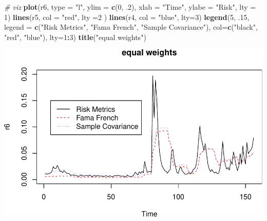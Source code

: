 \documentclass[11pt,]{article}
\newenvironment{Shaded}{\begin{snugshade}}{\end{snugshade}}
\newcommand{\CommentTok}[1]{\textcolor[rgb]{0.56,0.35,0.01}{\textit{#1}}}
\newcommand{\DataTypeTok}[1]{\textcolor[rgb]{0.13,0.29,0.53}{#1}}
\newcommand{\DecValTok}[1]{\textcolor[rgb]{0.00,0.00,0.81}{#1}}
\newcommand{\FloatTok}[1]{\textcolor[rgb]{0.00,0.00,0.81}{#1}}
\newcommand{\KeywordTok}[1]{\textcolor[rgb]{0.13,0.29,0.53}{\textbf{#1}}}
\newcommand{\NormalTok}[1]{#1}
\newcommand{\OperatorTok}[1]{\textcolor[rgb]{0.81,0.36,0.00}{\textbf{#1}}}
\newcommand{\StringTok}[1]{\textcolor[rgb]{0.31,0.60,0.02}{#1}}
\begin{document}
\begin{Shaded}
\begin{Highlighting}[]
\CommentTok{# viz }
\KeywordTok{plot}\NormalTok{(r6, }\DataTypeTok{type =} \StringTok{"l"}\NormalTok{, }\DataTypeTok{ylim =} \KeywordTok{c}\NormalTok{(}\DecValTok{0}\NormalTok{, }\FloatTok{.2}\NormalTok{), }\DataTypeTok{xlab =} \StringTok{"Time"}\NormalTok{, }\DataTypeTok{ylabe =} \StringTok{"Risk"}\NormalTok{, }
     \DataTypeTok{lty =} \DecValTok{1}\NormalTok{)}
\KeywordTok{lines}\NormalTok{(r5, }\DataTypeTok{col =} \StringTok{"red"}\NormalTok{, }\DataTypeTok{lty =}\DecValTok{2}\NormalTok{ )}
\KeywordTok{lines}\NormalTok{(r4, }\DataTypeTok{col =} \StringTok{"blue"}\NormalTok{, }\DataTypeTok{lty=}\DecValTok{3}\NormalTok{)}
\KeywordTok{legend}\NormalTok{(}\DecValTok{5}\NormalTok{, }\FloatTok{.15}\NormalTok{, }\DataTypeTok{legend =} \KeywordTok{c}\NormalTok{(}\StringTok{"Risk Metrics"}\NormalTok{, }
                           \StringTok{"Fama French"}\NormalTok{, }
                           \StringTok{"Sample Covariance"}\NormalTok{), }
       \DataTypeTok{col=}\KeywordTok{c}\NormalTok{(}\StringTok{"black"}\NormalTok{, }\StringTok{"red"}\NormalTok{, }\StringTok{"blue"}\NormalTok{),}
       \DataTypeTok{lty=}\DecValTok{1}\OperatorTok{:}\DecValTok{3}\NormalTok{)}
\KeywordTok{title}\NormalTok{(}\StringTok{"equal weights"}\NormalTok{)}
\end{Highlighting}
\end{Shaded}

\includegraphics{hw5_files/figure-latex/unnamed-chunk-4-2.pdf}
\newpage
\singlespacing 
\end{document}
